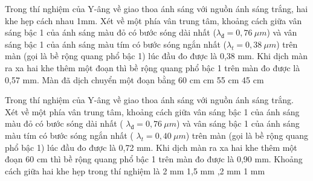 \begin{vidu}%
Trong thí nghiệm của Y-âng về giao thoa ánh sáng với nguồn ánh sáng trắng, hai khe hẹp cách nhau 1mm. Xét về một phía vân trung tâm, khoảng cách giữa vân sáng bậc 1 của ánh sáng màu đỏ có bước sóng dài nhất ($\lambda_{\text{đ}}=0,76\ \mu m$) và vân sáng bậc 1 của ánh sáng màu tím có bước sóng ngắn nhất (${{\lambda}_{t}}=0,38\ \mu m $) trên màn (gọi là bề rộng quang phổ bậc 1) lúc đầu đo được là 0,38 mm. Khi dịch màn ra xa hai khe thêm một đoạn thì bề rộng quang phổ bậc 1 trên màn đo được là 0,57  mm. Màn đã dịch chuyển một đoạn bằng
\choice
{60 cm}
{ cm}
{55 cm}
{45 cm}
\end{vidu} 
\begin{vidu}%
Trong thí nghiệm của Y-âng về giao thoa ánh sáng với nguồn ánh sáng trắng. Xét về một phía vân trung tâm, khoảng cách giữa vân sáng bậc 1 của ánh sáng màu đỏ có bước sóng dài nhất ( $\lambda_{\text{đ}}=0,76\ \mu m $) và vân sáng bậc 1 của ánh sáng màu tím có bước sóng ngắn nhất ( ${{\lambda}_{t}}=0,40\ \mu m $) trên màn (gọi là bề rộng quang phổ bậc 1) lúc đầu đo được là 0,72 mm. Khi dịch màn ra xa hai khe thêm một đoạn 60 cm thì bề rộng quang phổ bậc 1 trên màn đo được là 0,90 mm. Khoảng cách giữa hai khe hẹp trong thí nghiệm là
\choice
{2 mm}
{1,5 mm}
{,2 mm}
{1 mm}
\end{vidu} 
